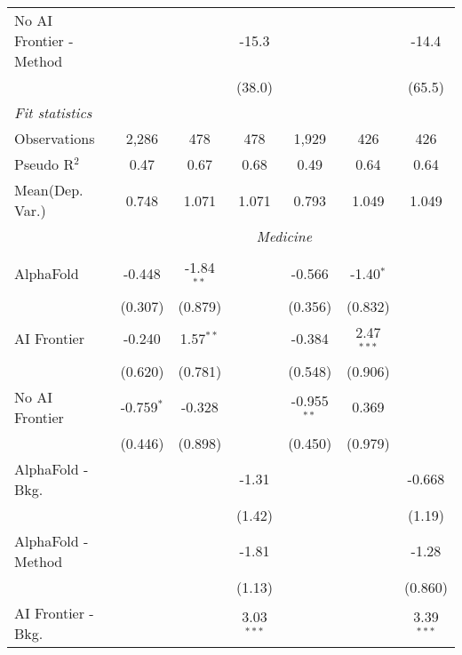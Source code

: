 \begin{tabular}{lcccccc}
   No AI Frontier - Method &               &              & -15.3        &               &              & -14.4\\   
                           &               &              & (38.0)       &               &              & (65.5)\\   
   \midrule
   \emph{Fit statistics}\\
   Observations            & 2,286         & 478          & 478          & 1,929         & 426          & 426\\  
   Pseudo R$^2$            & 0.47          & 0.67         & 0.68         & 0.49          & 0.64         & 0.64\\  
   
Mean(Dep. Var.) & 0.748 & 1.071 & 1.071 & 0.793 & 1.049 & 1.049 \\
 & \multicolumn{6}{c}{\textit{Medicine}} \\ \\
   AlphaFold               & -0.448       & -1.84$^{**}$ &               & -0.566        & -1.40$^{*}$  &   \\   
                           & (0.307)      & (0.879)      &               & (0.356)       & (0.832)      &   \\   
   AI Frontier             & -0.240       & 1.57$^{**}$  &               & -0.384        & 2.47$^{***}$ &   \\   
                           & (0.620)      & (0.781)      &               & (0.548)       & (0.906)      &   \\   
   No AI Frontier          & -0.759$^{*}$ & -0.328       &               & -0.955$^{**}$ & 0.369        &   \\   
                           & (0.446)      & (0.898)      &               & (0.450)       & (0.979)      &   \\   
   AlphaFold - Bkg.        &              &              & -1.31         &               &              & -0.668\\   
                           &              &              & (1.42)        &               &              & (1.19)\\   
   AlphaFold - Method      &              &              & -1.81         &               &              & -1.28\\   
                           &              &              & (1.13)        &               &              & (0.860)\\   
   AI Frontier - Bkg.      &              &              & 3.03$^{***}$  &               &              & 3.39$^{***}$\\   

\end{tabular}

